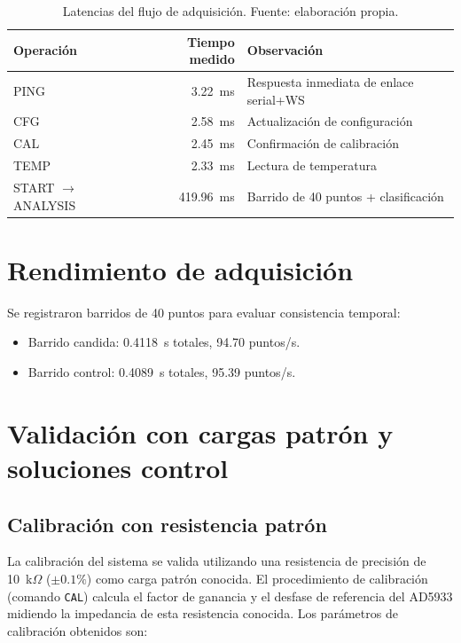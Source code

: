 \documentclass[11pt,a4paper,spanish]{book}
\begin{document}
\begin{table}[ht]
\centering
\begin{tabular}{l r l}
\hline\hline
Operaci\'{o}n & Tiempo medido & Observaci\'{o}n \\ [0.5ex]
\hline
PING & 3.22~ms & Respuesta inmediata de enlace serial+WS \\
CFG & 2.58~ms & Actualizaci\'{o}n de configuraci\'{o}n \\
CAL & 2.45~ms & Confirmaci\'{o}n de calibraci\'{o}n \\
TEMP & 2.33~ms & Lectura de temperatura \\
START $\rightarrow$ ANALYSIS & 419.96~ms & Barrido de 40 puntos + clasificaci\'{o}n \\
\hline
\end{tabular}
\caption[Latencias medidas]{Latencias del flujo de adquisici\'{o}n. Fuente: elaboraci\'{o}n propia.}
\label{tab:latencias-finales}
\end{table}

\section{Rendimiento de adquisici\'{o}n}

Se registraron barridos de 40 puntos para evaluar consistencia temporal:
\begin{itemize}
	\item Barrido candida: 0.4118~s totales, 94.70 puntos/s.
	\item Barrido control: 0.4089~s totales, 95.39 puntos/s.
\end{itemize}

\section{Validaci\'{o}n con cargas patr\'{o}n y soluciones control}
\label{sec:cargas-patron}

\subsection{Calibraci\'{o}n con resistencia patr\'{o}n}

La calibraci\'{o}n del sistema se valida utilizando una resistencia de precisi\'{o}n de 10~k$\Omega$ ($\pm 0.1\%$) como carga patr\'{o}n conocida. El procedimiento de calibraci\'{o}n (comando \texttt{CAL}) calcula el factor de ganancia y el desfase de referencia del AD5933 midiendo la impedancia de esta resistencia conocida. Los par\'{a}metros de calibraci\'{o}n obtenidos son:
\end{document}
